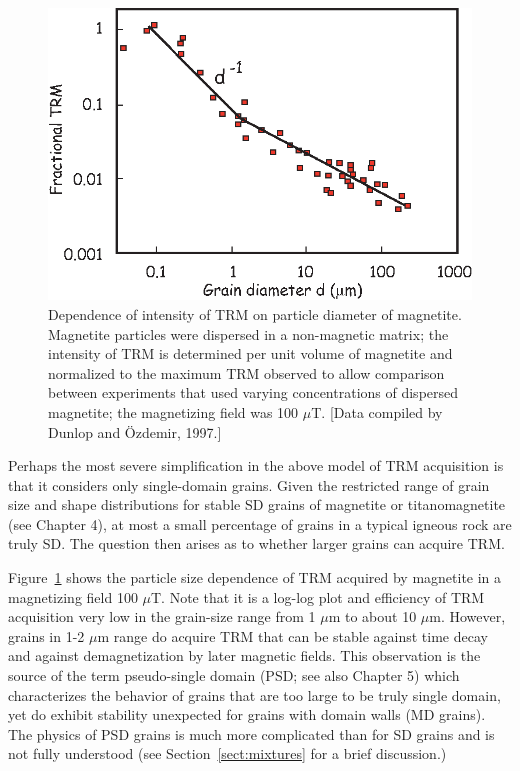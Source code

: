 \begin{figure}[htb]
\centering  \includegraphics[width=10 cm]{EPSfiles/trm-d.eps}
\caption{Dependence of intensity of TRM on particle diameter of magnetite. Magnetite particles were
dispersed in a non-magnetic matrix; the intensity of TRM is determined per unit volume of magnetite and normalized to the maximum TRM observed to allow
comparison between experiments that used varying concentrations of dispersed magnetite; the
magnetizing field was 100 $\mu$T. [Data compiled by Dunlop and \"Ozdemir, 1997.]   }
\label{fig:trm-d}
\end{figure}\nocite{dunlop97}

Perhaps the most severe simplification in the above model of TRM acquisition is that it considers only
single-domain grains. Given the restricted range of grain size and shape distributions for stable SD grains
of magnetite or titanomagnetite (see Chapter 4), at most a small percentage of grains in a typical igneous rock are truly SD. The question then arises as to whether larger  grains can acquire TRM.

Figure~\ref{fig:trm-d}  shows the particle size dependence of TRM acquired by magnetite in a magnetizing field 100 $\mu$T.  Note that it is a log-log plot and efficiency of TRM acquisition very low
in the grain-size range from 1 $\mu$m to about 10 $\mu$m. However,  grains in 1-2 $\mu$m range do acquire TRM that can
be stable against time decay and against demagnetization by later magnetic fields.  This observation is the source of the term 
 pseudo-single domain (PSD; see also Chapter 5) which characterizes the behavior of grains that are too large to be truly single domain, yet  do exhibit stability  unexpected for grains with domain walls (MD grains).  
The physics of PSD
grains is much more complicated than for SD grains and is not fully understood (see Section~\ref{sect:mixtures}  for a brief discussion.)
 

